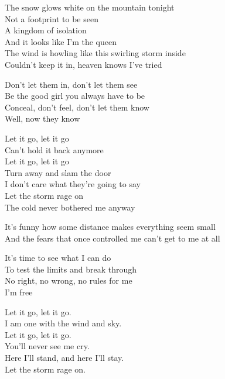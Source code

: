 
\ve{}
The snow glows white on the mountain tonight\\
Not a footprint to be seen \\
A kingdom of isolation\\
And it looks like I'm the queen \\
The wind is howling like this swirling storm  inside \\
Couldn't keep it in, heaven knows I've tried

Don't let them in, don't let them see\\
Be the good girl you always have to be\\
Conceal, don't feel, don't let them know\\
Well, now they know

Let it go, let it go\\
Can't hold it back anymore\\
Let it go, let it go \\
Turn away and slam the door\\
I don't care what they're going to say\\
Let the storm rage on\\
The cold never bothered me anyway

\ve{}
It's funny how some distance makes everything seem small\\
And the fears that once controlled me can't get to me at all

It's time to see what I can do\\
To test the limits and break through\\
No right, no wrong, no rules for me\\
I'm free

Let it go, let it go.\\
I am one with the wind and sky.\\
Let it go, let it go.\\
You'll never see me cry.\\
Here I'll stand, and here I'll stay.\\
Let the storm rage on.

